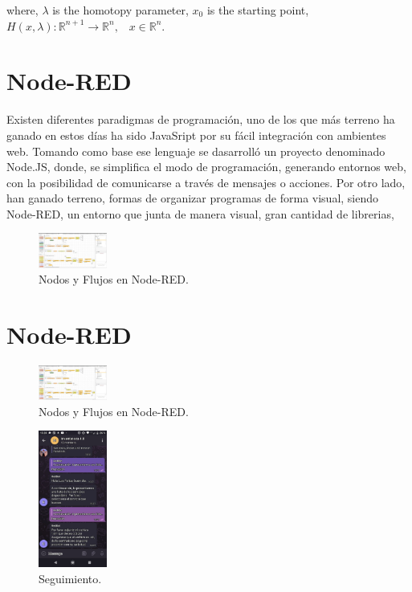 \documentclass[conference]{IEEEtran}
\begin{document}
     
     
 where,   $\lambda$ is the homotopy parameter,  $x_0$  is the starting point, $H( x,\lambda) :\mathbb{R}^{n+1}\longrightarrow \mathbb{R}^{n} \text{,} \quad{x} \in\mathbb{R}^{n}$. 
\section{Node-RED}
Existen diferentes paradigmas de programación, uno de los que más terreno ha ganado en estos días ha sido JavaSript por su fácil integración con ambientes web. Tomando como base ese lenguaje se dasarrolló un proyecto denominado Node.JS, donde, se simplifica el modo de programación, generando entornos web, con la posibilidad de comunicarse a través de mensajes o acciones. Por otro lado, han ganado terreno, formas de organizar programas de forma visual, siendo Node-RED, un entorno que junta de manera visual, gran cantidad de librerias, 

\begin{figure}[H]
\begin{center}
\includegraphics[width=0.2\textwidth]{imagenes/node.eps} 
\caption{ Nodos y Flujos en Node-RED.}
\label{fig:hiper2}
\end{center}
\end{figure}    


\section{Node-RED}
 \begin{figure}[H]
\begin{center}
\includegraphics[width=0.2\textwidth]{imagenes/node.eps} 
\caption{ Nodos y Flujos en Node-RED.}
\label{fig:hiper2}
\end{center}
\end{figure}    


  \begin{figure}[H]
\begin{center}
\includegraphics[width=0.2\textwidth]{imagenes/hiper2.eps} 
\caption{ Seguimiento.}
\label{fig:hiper3}
\end{center}
\end{figure}    
  
\end{document}

